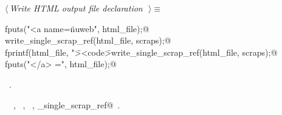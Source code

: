 \documentclass{report}
\begin{document}
\begin{flushleft} \small
\begin{minipage}{\linewidth} \label{scrap101}
$\langle\,${\it Write HTML output file declaration}\nobreak\ {\footnotesize {}}$\,\rangle\equiv$
\vspace{-1ex}
\begin{list}{}{} \item
\mbox{}\verb@  fputs("<a name=\"nuweb", html_file);@\\
\mbox{}\verb@  write_single_scrap_ref(html_file, scraps);@\\
\mbox{}\verb@  fprintf(html_file, "\"><code>\"%s\"</code> ", name->spelling);@\\
\mbox{}\verb@  write_single_scrap_ref(html_file, scraps);@\\
\mbox{}\verb@  fputs("</a> =\n", html_file);@\\
\mbox{}\verb@@{\NWsep}
\end{list}
\vspace{-1ex}
\footnotesize\addtolength{\baselineskip}{-1ex}
\begin{list}{}{\setlength{\itemsep}{-\parsep}\setlength{\itemindent}{-\leftmargin}}
\item \NWtxtMacroRefIn\ .
\end{list}
\vspace{-2ex}
\footnotesize\addtolength{\baselineskip}{-1ex}
\begin{list}{}{\setlength{\itemsep}{-\parsep}\setlength{\itemindent}{-\leftmargin}}
\item \NWtxtIdentsUsed\nobreak\  \verb@fprintf@\nobreak\ , \verb@fputs@\nobreak\ , \verb@scraps@\nobreak\ , \verb@write_single_scrap_ref@\nobreak\ .\end{list}
\end{minipage}\\[4ex]
\end{flushleft}
\end{document}
